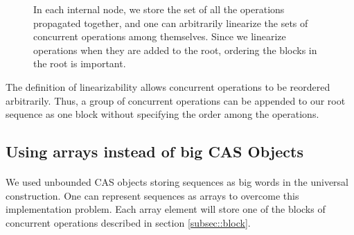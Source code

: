 \documentclass[10pt]{article}
\newtheorem{lemma}[theorem]{Lemma}
\theoremstyle{definition}
\begin{document}
 \begin{figure}[h]
\begin{center}
\caption{\label{fig::set} In each internal node, we store the set of all the operations propagated together, and one can arbitrarily linearize the sets of concurrent operations among themselves. Since we linearize operations when they are added to the root, ordering the blocks in the root is important.}
\end{center}
\end{figure}


The definition of linearizability allows concurrent operations to be reordered arbitrarily. Thus, a group of concurrent operations can be appended to our root sequence as one block without specifying the order among the operations.



\subsection{Using arrays instead of big CAS Objects}
\paragraph{}
 We used unbounded CAS objects storing sequences as big words in the universal construction. One can represent sequences as arrays to overcome this implementation problem. Each array element will store one of the blocks of concurrent operations described in section \ref{subsec::block}.
 
\end{document}
